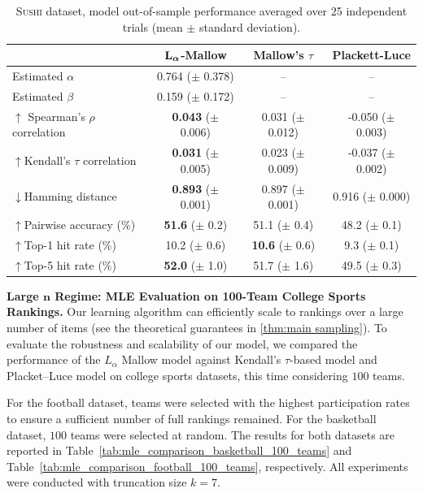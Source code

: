 \documentclass{article}
\begin{document}
\begin{table}[h!]
\centering
\setlength{\tabcolsep}{8pt}
\begin{tabular}{|l|c|c|c|}
\hline
 & \textbf{$\bold{L}_{\boldsymbol{\alpha}}$-Mallow} &  {Mallow's $\tau$} & {Plackett-Luce} \\
\hline
Estimated $\alpha$ & 0.764 \;($\pm$ 0.378) & -- & -- \\
Estimated $\beta$  & 0.159 \;($\pm$ 0.172) & -- & -- \\
\hline
$\uparrow$ Spearman's $\rho$ correlation   & \textbf{0.043} \;($\pm$ 0.006) & 0.031 \;($\pm$ 0.012) & -0.050 \;($\pm$ 0.003) \\
$\uparrow $Kendall's $\tau$ correlation    & \textbf{0.031} \;($\pm$ 0.005) & 0.023 \;($\pm$ 0.009) & -0.037 \;($\pm$ 0.002) \\
$\downarrow$Hamming distance  & \textbf{0.893} \;($\pm$ 0.001) & {0.897} \;($\pm$ 0.001) & 0.916 \;($\pm$ 0.000) \\
$\uparrow $Pairwise accuracy (\%)          & \textbf{51.6} \;($\pm$ 0.2)    & 51.1 \;($\pm$ 0.4)    & {48.2} \;($\pm$ 0.1)    \\
$\uparrow$Top-1 hit rate (\%)            & 10.2 \;($\pm$ 0.6)    & \textbf{10.6} \;($\pm$ 0.6)    & {9.3} \;($\pm$ 0.1)     \\
$ \uparrow$Top-5 hit rate (\%)            & \textbf{52.0} \;($\pm$ 1.0)    & 
51.7 \;($\pm$ 1.6)    & {49.5} \;($\pm$ 0.3)    \\
\hline
\end{tabular}
\caption{\textsc{Sushi} dataset, model out-of-sample performance averaged over 25 independent trials (mean $\pm$ standard deviation).}
\label{tab:mle_comparison_sushi}
\end{table}





\textbf{Large $\boldsymbol{n}$ Regime: MLE Evaluation on 100-Team College Sports Rankings.}
Our learning algorithm  can efficiently scale to rankings over a large number of items (see the theoretical guarantees in \ref{thm:main sampling}). To evaluate the robustness and scalability of our model, we compared the performance of the $L_\alpha$ Mallow model against Kendall’s $\tau$-based model and Placket–Luce model on college sports datasets, this time considering $100$ teams.

For the football dataset, teams were selected with the highest participation rates to ensure a sufficient number of full rankings remained. For the basketball dataset, $100$ teams were selected at random. The results for both datasets are reported in Table~\ref{tab:mle_comparison_basketball_100_teams} and Table~\ref{tab:mle_comparison_football_100_teams}, respectively. All experiments were conducted with truncation size $k=7$.
\end{document}
